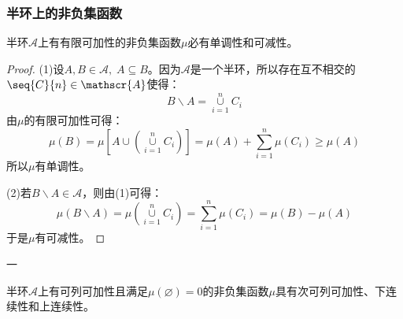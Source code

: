 \subsubsection{半环上的非负集函数}
\begin{theorem}\label{theo:SemiringFiniteAdditivitySetfunction}
	半环$\mathscr{A}$上有有限可加性的非负集函数$\mu$必有单调性和可减性。
\end{theorem}
\begin{proof}
	(1)设$A,B\in\mathscr{A},\;A\subseteq B$。因为$\mathscr{A}$是一个半环，所以存在互不相交的$\seq{C}{n}\in \mathscr{A}$使得：
	\begin{equation*}
		B\backslash A=\underset{i=1}{\overset{n}{\cup}}C_i
	\end{equation*}
	由$\mu$的有限可加性可得：
	\begin{equation*}
		\mu(B)=\mu\left[A\cup\left(\underset{i=1}{\overset{n}{\cup}}C_i\right)\right]=\mu(A)+\sum_{i=1}^{n}\mu(C_i)\geqslant\mu(A)
	\end{equation*}
	所以$\mu$有单调性。\par
	(2)若$B\backslash A\in\mathscr{A}$，则由(1)可得：
	\begin{equation*}
		\mu(B\backslash A)=\mu\left(\underset{i=1}{\overset{n}{\cup}}C_i\right)=\sum_{i=1}^{n}\mu(C_i)=\mu(B)-\mu(A)
	\end{equation*}
	于是$\mu$有可减性。
\end{proof}
一
\begin{theorem}\label{theo:SemiringCountableAdditivitySetFunction}
	半环$\mathscr{A}$上有可列可加性且满足$\mu(\varnothing)=0$的非负集函数$\mu$具有次可列可加性、下连续性和上连续性。
\end{theorem}
